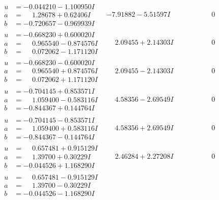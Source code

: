 \documentclass[1p]{elsarticle_modified}
\theoremstyle{definition}
\begin{document}
$$\begin{array}{c|c|c}
\begin{aligned}
u &= -0.044210 - 1.100950 I \\
a &= \phantom{-}1.28678 + 0.62406 I \\
b &= -0.720657 - 0.969939 I\end{aligned}
 & -7.91882 - 5.51597 I & \phantom{-0.000000 } 0 \\ \hline\begin{aligned}
u &= -0.668230 + 0.600020 I \\
a &= \phantom{-}0.965540 - 0.874576 I \\
b &= \phantom{-}0.072062 - 1.171120 I\end{aligned}
 & \phantom{-}2.09455 + 2.14303 I & \phantom{-0.000000 } 0 \\ \hline\begin{aligned}
u &= -0.668230 - 0.600020 I \\
a &= \phantom{-}0.965540 + 0.874576 I \\
b &= \phantom{-}0.072062 + 1.171120 I\end{aligned}
 & \phantom{-}2.09455 - 2.14303 I & \phantom{-0.000000 } 0 \\ \hline\begin{aligned}
u &= -0.704145 + 0.853571 I \\
a &= \phantom{-}1.059400 - 0.583116 I \\
b &= -0.844367 + 0.144764 I\end{aligned}
 & \phantom{-}4.58356 - 2.69549 I & \phantom{-0.000000 } 0 \\ \hline\begin{aligned}
u &= -0.704145 - 0.853571 I \\
a &= \phantom{-}1.059400 + 0.583116 I \\
b &= -0.844367 - 0.144764 I\end{aligned}
 & \phantom{-}4.58356 + 2.69549 I & \phantom{-0.000000 } 0 \\ \hline\begin{aligned}
u &= \phantom{-}0.657481 + 0.915129 I \\
a &= \phantom{-}1.39700 + 0.30229 I \\
b &= -0.044526 + 1.168290 I\end{aligned}
 & \phantom{-}2.46284 + 2.27208 I & \phantom{-0.000000 } 0 \\ \hline\begin{aligned}
u &= \phantom{-}0.657481 - 0.915129 I \\
a &= \phantom{-}1.39700 - 0.30229 I \\
b &= -0.044526 - 1.168290 I\end{aligned}

\end{array}$$
\end{document}
